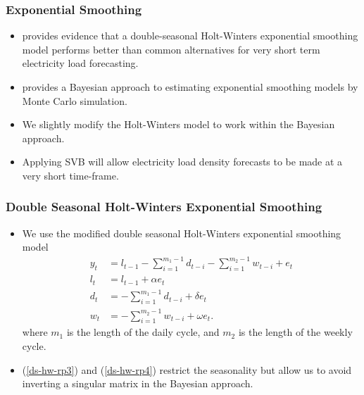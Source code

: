 \documentclass{beamer}\usepackage[]{graphicx}\usepackage[]{color}
\begin{document}
\begin{frame}
\frametitle{Exponential Smoothing}
\begin{itemize}
\item \citet{Taylor2008} provides evidence that a double-seasonal Holt-Winters exponential smoothing model performs better than common alternatives for very short term electricity load forecasting.
\item \citet{Forbes2000} provides a Bayesian approach to estimating exponential smoothing models by Monte Carlo simulation.
\item We slightly modify the Holt-Winters model to work within the Bayesian approach.
\item Applying SVB will allow electricity load density forecasts to be made at a very short time-frame.
\end{itemize}
\end{frame}


\begin{frame}
\frametitle{Double Seasonal Holt-Winters Exponential Smoothing}
\begin{itemize}
\item We use the modified double seasonal Holt-Winters exponential smoothing model
\begin{align}
y_t &= l_{t-1} - \sum_{i = 1}^{m_1 - 1}d_{t-i} - \sum_{i = 1}^{m_2 - 1}w_{t-i} + e_t \label{ds-hw-rp1} \\
l_t &= l_{t-1} + \alpha e_t \label{ds-hw-rp2} \\
d_t &= - \sum_{i = 1}^{m_1 - 1}d_{t-i} + \delta e_t \label{ds-hw-rp3} \\
w_t &= - \sum_{i = 1}^{m_2 - 1}w_{t-i} + \omega e_t \label{ds-hw-rp4}.
\end{align}
where $m_1$ is the length of the daily cycle, and $m_2$ is the length of the weekly cycle.
\item (\ref{ds-hw-rp3}) and (\ref{ds-hw-rp4}) restrict the seasonality but allow us to avoid inverting a singular matrix in the Bayesian approach.
\end{itemize}
\end{frame}
\end{document}
